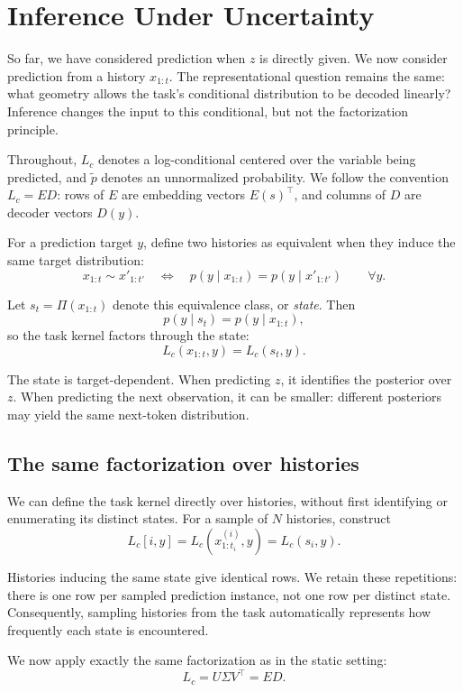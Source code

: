 \section{Inference Under Uncertainty}

So far, we have considered prediction when $z$ is directly given. We now consider prediction from a history $x_{1:t}$. The representational question remains the same: what geometry allows the task's conditional distribution to be decoded linearly? Inference changes the input to this conditional, but not the factorization principle.

Throughout, $L_c$ denotes a log-conditional centered over the variable being predicted, and $\tilde p$ denotes an unnormalized probability. We follow the convention $L_c=ED$: rows of $E$ are embedding vectors $E(s)^\top$, and columns of $D$ are decoder vectors $D(y)$.

For a prediction target $y$, define two histories as equivalent when they induce the same target distribution:
\[
x_{1:t}\sim x'_{1:t'}
\quad\Longleftrightarrow\quad
p(y\mid x_{1:t})=p(y\mid x'_{1:t'})
\qquad \forall y.
\]

Let $s_t=\Pi(x_{1:t})$ denote this equivalence class, or \emph{state}. Then
\[
p(y\mid s_t)=p(y\mid x_{1:t}),
\]
so the task kernel factors through the state:
\[
L_c(x_{1:t},y)=L_c(s_t,y).
\]

The state is target-dependent. When predicting $z$, it identifies the posterior over $z$. When predicting the next observation, it can be smaller: different posteriors may yield the same next-token distribution.

\subsection{The same factorization over histories}

We can define the task kernel directly over histories, without first identifying or enumerating its distinct states. For a sample of $N$ histories, construct
\[
L_c[i,y]
=
L_c(x^{(i)}_{1:t_i},y)
=
L_c(s_i,y).
\]

Histories inducing the same state give identical rows. We retain these repetitions: there is one row per sampled prediction instance, not one row per distinct state. Consequently, sampling histories from the task automatically represents how frequently each state is encountered.

We now apply exactly the same factorization as in the static setting:
\[
L_c=U\Sigma V^\top=ED.
\]

